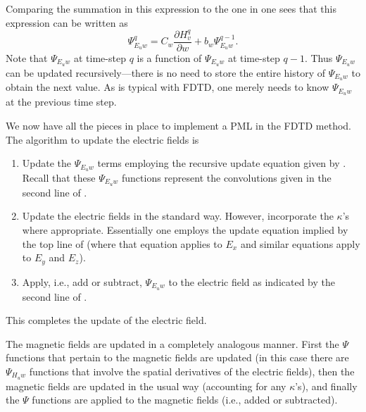 Comparing the summation in this expression to the one in
 one sees that this expression can be written as
\begin{equation}
  \Psi_{E_uw}^q =
  C_w \frac{\partial H_v^q}{\partial w} + 
  b_w \Psi_{E_uw}^{q-1}.
  \label{eq:psiRecursive}
\end{equation}
Note that $\Psi_{E_uw}$ at time-step $q$ is a function of
$\Psi_{E_uw}$ at time-step $q-1$.  Thus $\Psi_{E_uw}$ can be
updated recursively---there is no need to store the entire history of
$\Psi_{E_uw}$ to obtain the next value.  As is typical with FDTD, one
merely needs to know $\Psi_{E_uw}$ at the previous time step.

We now have all the pieces in place to implement a PML in the FDTD
method.  The algorithm to update the electric fields is
\begin{enumerate}
\item Update the $\Psi_{E_uw}$ terms employing the recursive update
equation given by .  Recall that these 
$\Psi_{E_uw}$ functions represent the convolutions given in the second
line of .
\item Update the electric fields in the standard way.  However, 
incorporate the $\kappa$'s where appropriate.  Essentially one
employs the update equation implied by the top line of
 (where that equation applies to $E_x$ and similar
equations apply to $E_y$ and $E_z$).  
\item Apply, i.e., add or subtract, $\Psi_{E_uw}$ to the electric
field as indicated by the second line of .
\end{enumerate}
This completes the update of the electric field.

The magnetic fields are updated in a completely analogous manner.
First the $\Psi$ functions that pertain to the magnetic fields are
updated (in this case there are $\Psi_{H_uw}$ functions that involve
the spatial derivatives of the electric fields), then the magnetic
fields are updated in the usual way (accounting for any $\kappa$'s),
and finally the $\Psi$ functions are applied to the magnetic fields
(i.e., added or subtracted).
